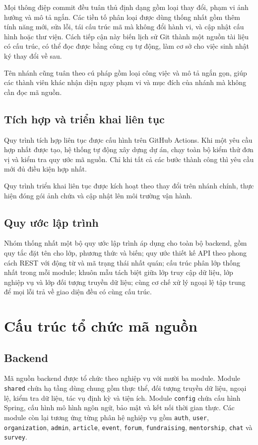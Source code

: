 \documentclass[12pt,a4paper,oneside]{report}
\begin{document}
Mọi thông điệp commit đều tuân thủ định dạng gồm loại thay đổi, phạm vi ảnh hưởng và mô tả ngắn. Các tiền tố phân loại được dùng thống nhất gồm thêm tính năng mới, sửa lỗi, tái cấu trúc mã mà không đổi hành vi, và cập nhật cấu hình hoặc thư viện. Cách tiếp cận này biến lịch sử Git thành một nguồn tài liệu có cấu trúc, có thể đọc được bằng công cụ tự động, làm cơ sở cho việc sinh nhật ký thay đổi về sau.

Tên nhánh cũng tuân theo cú pháp gồm loại công việc và mô tả ngắn gọn, giúp các thành viên khác nhận diện ngay phạm vi và mục đích của nhánh mà không cần đọc mã nguồn.

\subsection{Tích hợp và triển khai liên tục}

Quy trình tích hợp liên tục được cấu hình trên GitHub Actions. Khi một yêu cầu hợp nhất được tạo, hệ thống tự động xây dựng dự án, chạy toàn bộ kiểm thử đơn vị và kiểm tra quy ước mã nguồn. Chỉ khi tất cả các bước thành công thì yêu cầu mới đủ điều kiện hợp nhất.

Quy trình triển khai liên tục được kích hoạt theo thay đổi trên nhánh chính, thực hiện đóng gói ảnh chứa và cập nhật lên môi trường vận hành.

\subsection{Quy ước lập trình}

Nhóm thống nhất một bộ quy ước lập trình áp dụng cho toàn bộ backend, gồm quy tắc đặt tên cho lớp, phương thức và biến; quy ước thiết kế API theo phong cách REST với động từ và mã trạng thái nhất quán; cấu trúc phân lớp thống nhất trong mỗi module; khuôn mẫu tách biệt giữa lớp truy cập dữ liệu, lớp nghiệp vụ và lớp đối tượng truyền dữ liệu; cùng cơ chế xử lý ngoại lệ tập trung để mọi lỗi trả về giao diện đều có cùng cấu trúc.

\section{Cấu trúc tổ chức mã nguồn}

\subsection{Backend}

Mã nguồn backend được tổ chức theo nghiệp vụ với mười ba module. Module \texttt{shared} chứa hạ tầng dùng chung gồm thực thể, đối tượng truyền dữ liệu, ngoại lệ, kiểm tra dữ liệu, tác vụ định kỳ và tiện ích. Module \texttt{config} chứa cấu hình Spring, cấu hình mô hình ngôn ngữ, bảo mật và kết nối thời gian thực. Các module còn lại tương ứng từng phân hệ nghiệp vụ gồm \texttt{auth}, \texttt{user}, \texttt{organization}, \texttt{admin}, \texttt{article}, \texttt{event}, \texttt{forum}, \texttt{fundraising}, \texttt{mentorship}, \texttt{chat} và \texttt{survey}.
\end{document}
